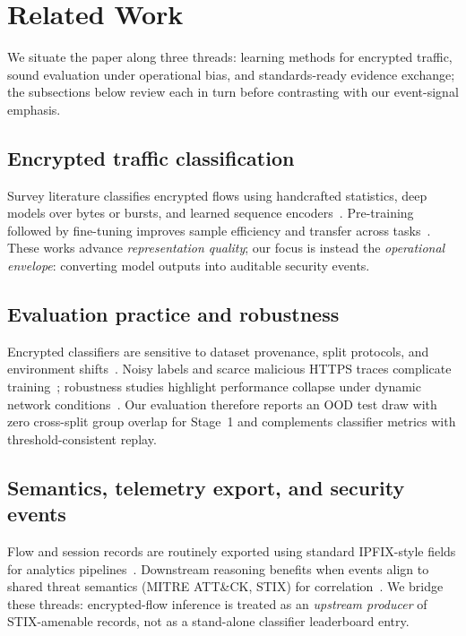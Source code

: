 \section{Related Work}
\label{sec:related}

We situate the paper along three threads: learning methods for encrypted traffic, sound evaluation under operational bias, and standards-ready evidence exchange; the subsections below review each in turn before contrasting with our event-signal emphasis.

\subsection{Encrypted traffic classification}

Survey literature classifies encrypted flows using handcrafted statistics, deep models over bytes or bursts, and learned sequence encoders~\cite{aceto2019mobile}.
Pre-training followed by fine-tuning improves sample efficiency and transfer across tasks~\cite{lin2022etbert,zhou2025trafficformer}.
These works advance \emph{representation quality}; our focus is instead the \emph{operational envelope}: converting model outputs into auditable security events.

\subsection{Evaluation practice and robustness}

Encrypted classifiers are sensitive to dataset provenance, split protocols, and environment shifts~\cite{wickramasinghe2025sok}.
Noisy labels and scarce malicious HTTPS traces complicate training~\cite{qing2024rapier}; robustness studies highlight performance collapse under dynamic network conditions~\cite{qing2025dynamic}.
Our evaluation therefore reports an OOD test draw with zero cross-split group overlap for Stage~1 and complements classifier metrics with threshold-consistent replay.

\subsection{Semantics, telemetry export, and security events}

Flow and session records are routinely exported using standard IPFIX-style fields for analytics pipelines~\cite{rfc7011}.
Downstream reasoning benefits when events align to shared threat semantics (MITRE ATT\&CK, STIX) for correlation~\cite{mitre2025attack,oasis2020stix}.
We bridge these threads: encrypted-flow inference is treated as an \emph{upstream producer} of STIX-amenable records, not as a stand-alone classifier leaderboard entry.
